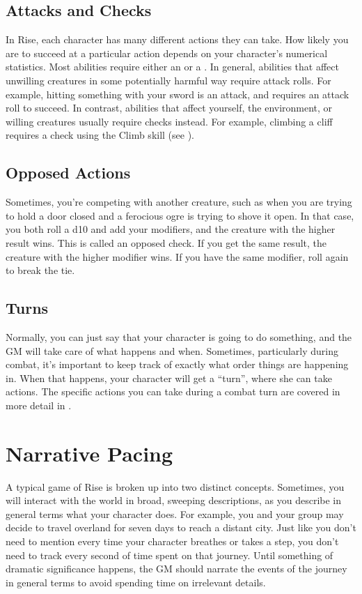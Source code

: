     \subsection{Attacks and Checks}
        In Rise, each character has many different actions they can take.
        How likely you are to succeed at a particular action depends on your character's numerical statistics.
        Most abilities require either an  or a .
        In general, abilities that affect unwilling creatures in some potentially harmful way require attack rolls.
        For example, hitting something with your sword is an attack, and requires an attack roll to succeed.
        In contrast, abilities that affect yourself, the environment, or willing creatures usually require checks instead.
        For example, climbing a cliff requires a check using the Climb skill (see ).


    \subsection{Opposed Actions}
        Sometimes, you're competing with another creature, such as when you are trying to hold a door closed and a ferocious ogre is trying to shove it open.
        In that case, you both roll a d10 and add your modifiers, and the creature with the higher result wins.
        This is called an opposed check.
        If you get the same result, the creature with the higher modifier wins.
        If you have the same modifier, roll again to break the tie.

    \subsection{Turns}
        Normally, you can just say that your character is going to do something, and the GM will take care of what happens and when.
        Sometimes, particularly during combat, it's important to keep track of exactly what order things are happening in.
        When that happens, your character will get a ``turn'', where she can take actions.
        The specific actions you can take during a combat turn are covered in more detail in .

\section{Narrative Pacing}
    A typical game of Rise is broken up into two distinct concepts.
    Sometimes, you will interact with the world in broad, sweeping descriptions, as you describe in general terms what your character does.
    For example, you and your group may decide to travel overland for seven days to reach a distant city.
    Just like you don't need to mention every time your character breathes or takes a step, you don't need to track every second of time spent on that journey.
    Until something of dramatic significance happens, the GM should narrate the events of the journey in general terms to avoid spending time on irrelevant details.

